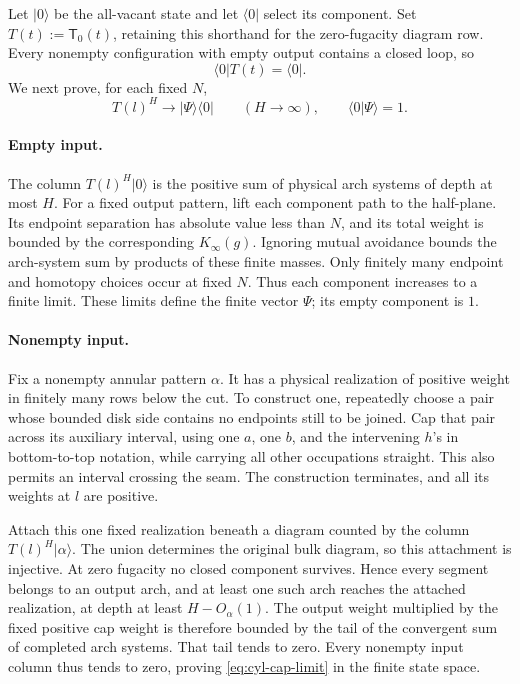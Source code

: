 Let \(|0\rangle\) be the all-vacant state and let \(\langle0|\) select
its component.  Set \(T(t):=\mathsf T_0(t)\), retaining this shorthand
for the zero-fugacity diagram row.  Every nonempty configuration with
empty output contains a closed loop, so
\[
 \langle0|T(t)=\langle0|.
\]
We next prove, for each fixed \(N\),
\begin{equation}\label{eq:cyl-cap-limit}
 T(l)^H\longrightarrow|\Psi\rangle\langle0|
 \qquad(H\to\infty),\qquad \langle0|\Psi\rangle=1.
\end{equation}

\paragraph{Empty input.}
The column \(T(l)^H|0\rangle\) is the positive sum of physical arch
systems of depth at most \(H\).  For a fixed output pattern, lift each
component path to the half-plane.  Its endpoint separation has
absolute value less than \(N\), and its total weight is bounded by
the corresponding \(K_\infty(g)\).  Ignoring mutual avoidance bounds
the arch-system sum by products of these finite masses.  Only
finitely many endpoint and homotopy choices occur at fixed \(N\).
Thus each component increases to a finite limit.  These limits define
the finite vector \(\Psi\); its empty component is \(1\).

\paragraph{Nonempty input.}
Fix a nonempty annular pattern \(\alpha\).  It has a physical
realization of positive weight in finitely many rows below the cut.
To construct one, repeatedly choose a pair whose bounded disk side
contains no endpoints still to be joined.  Cap that pair across its
auxiliary interval, using one \(a\), one \(b\), and the intervening
\(h\)'s in bottom-to-top notation, while carrying all other
occupations straight.  This also permits an interval crossing the
seam.  The construction terminates, and all its weights at \(l\)
are positive.

Attach this one fixed realization beneath a diagram counted by the
column \(T(l)^H|\alpha\rangle\).  The union determines the original
bulk diagram, so this attachment is injective.  At zero fugacity no
closed component survives.  Hence every segment belongs to an output
arch, and at least one such arch reaches the attached realization,
at depth at least \(H-O_\alpha(1)\).  The output weight multiplied by
the fixed positive cap weight is therefore bounded by the tail of the
convergent sum of completed arch systems.  That tail tends to zero.  Every
nonempty input column thus tends to zero, proving
\eqref{eq:cyl-cap-limit} in the finite state space.

